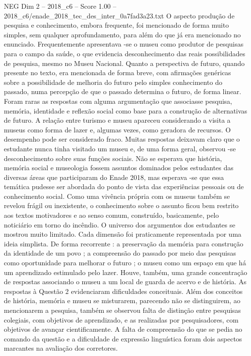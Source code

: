\begin{textsample}{NEG Dim 2 – 2018\_c6 – Score 1.00 – 2018\_c6/enade\_2018\_tec\_des\_inter\_0a7fad3a23.txt}
O aspecto produção de pesquisa e conhecimento, embora frequente, foi mencionado de forma muito simples, sem qualquer aprofundamento, para além do que já era mencionado no enunciado.
Frequentemente apresentava -se o museu como produtor de pesquisas para o campo da saúde, o que evidencia desconhecimento das reais possibilidades de pesquisa, mesmo no Museu Nacional.
Quanto a perspectiva de futuro, quando presente no texto, era mencionada de forma breve, com afirmações genéricas sobre a possibilidade de melhoria do futuro pelo simples conhecimento do passado, numa percepção de que o passado determina o futuro, de forma linear.
Foram raras as respostas com alguma argumentação que associasse pesquisa, memória, identidade e reflexão social como base para a construção de alternativas de futuro.
A relação entre turismo e museu apareceu considerando a visita a museus como forma de lazer e, algumas vezes, como geradora de recursos.
O desempenho pode ser considerado fraco.
Muitas respostas deixavam claro que o estudante nunca tinha visitado um museu e, de uma forma geral, observou -se desconhecimento sobre suas funções sociais.
Não se esperava que história, memória social e museologia fossem assuntos dominados pelos estudantes das diversas áreas que participaram do Enade 2018, mas esperava -se que essa temática pudesse ser abordada do ponto de vista das experiências pessoais ou de conhecimento social.
Como uma vivência própria com os museus também se revelou frágil ou inexistente, o conhecimento sobre o assunto ficou bem restrito aos textos motivadores e ao senso comum, construído, basicamente, pelo noticiário em torno do incêndio.
O universo dos argumentos dos estudantes se mostrou muito limitado.
Cada dimensão foi praticamente representada por uma ideia simplista.
De forma recorrente : a preservação da memória para construção da identidade de um povo ; a compreensão do passado por meio das pesquisas como oportunidade para melhorar o futuro ; o museu como um espaço em que há um aprendizado estimulado pelo lazer.
Houve, também, uma grande concentração de respostas associando o museu a um local de guarda de acervo e de história.
As respostas à Questão 2 evidenciaram dificuldades conceituais.
Além dos conceitos de história, memória e museu se misturarem, parecendo não se distinguirem, ao mencionarem a pesquisa, também se observou falta de distinção entre pesquisas colegiais, com objetivos de aprendizado, e as realizadas por pesquisadores, com objetivos de avançar cientificamente.
A falta de compreensão do que se pedia no comando da questão e a dificuldade de expressão linguística foram dois aspectos marcantes na avaliação dos corretores.

\end{textsample}
